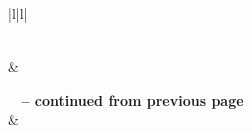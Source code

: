 \documentclass[12pt]{article}
\begin{document}
\begin{itemize}
        \begin{center}
        \begin{longtable}{|l|l|}
        \caption{A table showing Number of URI-Rs with associated to a particular number of momentos} \label{tab:long} \\
        
        \hline {} &   \\ \hline 
        \endfirsthead
        
        {{\bfseries \tablename\ \thetable{} -- continued from previous page}} \\
        \hline {} &   \\ \hline 
        \endhead
        
        \hline {} \\ \hline
        \endfoot
        

\end{longtable}
\end{center}
\end{itemize}
\end{document}

